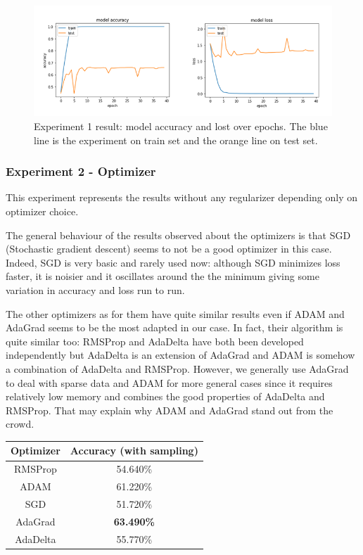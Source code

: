 \documentclass[11pt, openany]{report}
\theoremstyle{plain}
\theoremstyle{definition}
\theoremstyle{remark}
\begin{document}
\begin{figure}[H]
  \centering
  \includegraphics[scale=0.6]{Code/ch5-ModelPrototype/figures_result/40epochs_sample_withoutoptimisation.PNG}
  \caption{Experiment 1 result: model accuracy and lost over epochs. The blue line is the experiment on train set and the orange line on test set.}
  \label{fig:cifar_epoch_res}
\end{figure}
 
\subsubsection{Experiment 2 - Optimizer} 

This experiment represents the results without any regularizer depending only on optimizer choice.

The general behaviour of the results observed about the optimizers is that SGD (Stochastic gradient descent) seems to not be a good optimizer in this case. Indeed, SGD is very basic and rarely used now: although SGD minimizes loss faster, it is noisier and it oscillates around the the minimum giving some variation in accuracy and loss run to run.

The other optimizers as for them have quite similar results even if ADAM and AdaGrad seems to be the most adapted in our case. In fact, their algorithm is quite similar too: RMSProp and AdaDelta have both been developed independently but AdaDelta is an extension of AdaGrad and ADAM is somehow a combination of AdaDelta and RMSProp. However, we generally use AdaGrad to deal with sparse data and ADAM for more general cases since it requires relatively low memory and combines the good properties of AdaDelta and RMSProp. That may explain why ADAM and AdaGrad stand out from the crowd. 

\begin{center}
\begin{tabular}{|c|c|}
  \hline
  Optimizer & Accuracy (with sampling) \\
  \hline
  RMSProp & 54.640\% \\
  ADAM  & 61.220\% \\
  SGD & 51.720\% \\
  AdaGrad & \textbf{63.490\%} \\
  AdaDelta & 55.770\% \\
  \hline
\end{tabular}
\end{center}
\end{document}
